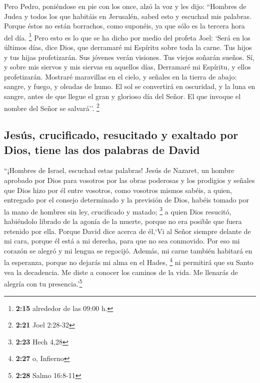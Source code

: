  Pero Pedro, poniéndose en pie con los once, alzó la voz
y les dijo: ``Hombres de Judea y todos los que habitáis en Jerusalén,
sabed esto y escuchad mis palabras.  Porque éstos no
están borrachos, como suponéis, ya que sólo es la tercera hora del día.
\footnote{\textbf{2:15} alrededor de las 09:00 h.}  Pero
esto es lo que se ha dicho por medio del profeta Joel: 
`Será en los últimos días, dice Dios, que derramaré mi Espíritu sobre
toda la carne. Tus hijos y tus hijas profetizarán. Sus jóvenes verán
visiones. Tus viejos soñarán sueños.  Sí, y sobre mis
siervos y mis siervas en aquellos días, Derramaré mi Espíritu, y ellos
profetizarán.  Mostraré maravillas en el cielo, y señales
en la tierra de abajo: sangre, y fuego, y oleadas de humo.
 El sol se convertirá en oscuridad, y la luna en sangre,
antes de que llegue el gran y glorioso día del Señor.  El
que invoque el nombre del Señor se salvará''. \footnote{\textbf{2:21}
  Joel 2:28-32}

\hypertarget{jesuxfas-crucificado-resucitado-y-exaltado-por-dios-tiene-las-dos-palabras-de-david}{%
\subsection{Jesús, crucificado, resucitado y exaltado por Dios, tiene
las dos palabras de
David}\label{jesuxfas-crucificado-resucitado-y-exaltado-por-dios-tiene-las-dos-palabras-de-david}}

 ``¡Hombres de Israel, escuchad estas palabras! Jesús de
Nazaret, un hombre aprobado por Dios para vosotros por las obras
poderosas y los prodigios y señales que Dios hizo por él entre vosotros,
como vosotros mismos sabéis,  a quien, entregado por el
consejo determinado y la previsión de Dios, habéis tomado por la mano de
hombres sin ley, crucificado y matado; \footnote{\textbf{2:23} Hech 4,28}
 a quien Dios resucitó, habiéndolo librado de la agonía
de la muerte, porque no era posible que fuera retenido por ella.
 Porque David dice acerca de él,`Vi al Señor siempre
delante de mi cara, porque él está a mi derecha, para que no sea
conmovido.  Por eso mi corazón se alegró y mi lengua se
regocijó. Además, mi carne también habitará en la esperanza,
 porque no dejarás mi alma en el Hades, \footnote{\textbf{2:27}
  o, Infierno} ni permitirá que su Santo vea la decadencia.
 Me diste a conocer los caminos de la vida. Me llenarás
de alegría con tu presencia.'\footnote{\textbf{2:28} Salmo 16:8-11}

